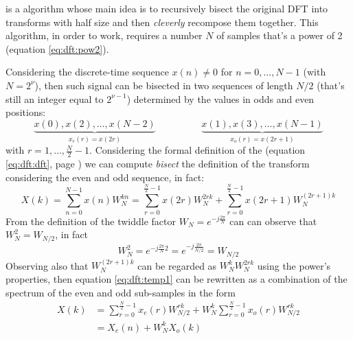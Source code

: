 		 is a \fft algorithm whose main idea is to recursively bisect the original DFT into transforms with half size and then \textit{cleverly} recompose them together. This algorithm, in order to work, requires a number $N$ of samples that's a power of 2 (equation \ref{eq:dft:pow2}).
		
		Considering the discrete-time sequence $x(n) \neq 0$ for $n=0,\dots, N-1$ (with $N=2^\nu$), then such signal can be bisected in two sequences of length $N/2$ (that's still an integer equal to $2^{\nu-1}$) determined by the values in odds and even positions:
		\begin{equation}
			\underbrace{x(0),x(2),\dots, x(N-2)}_{x_e(r) = x(2r)} \hspace{2cm} \underbrace{x(1),x(3),\dots, x(N-1)}_{x_o(r) = x(2r+1)} 
		\end{equation}
		with $r = 1,\dots, \frac N2-1$. Considering the formal definition of the \dft (equation \ref{eq:dft:dft}, page \pageref{eq:dft:dft}) we can compute \textit{bisect} the definition of the transform considering the even and odd sequence, in fact:
		\begin{equation} \label{eq:dft:temp1}
			X(k) = \sum_{n=0}^{N-1} x(n) W_{N}^{kn} = \sum_{r=0}^{\frac N2-1} x(2r) W_N^{2rk} + \sum_{r=0}^{\frac N2-1} x(2r+1) W_N^{(2r + 1)k}
		\end{equation}
		From the definition of the twiddle factor $W_N = e^{-j\frac{2\pi}{N}}$ can can observe that $W_N^2 = W_{N/2}$, in fact
		\begin{equation}
			W_N^2 = e^{-j\frac{2\pi}{N}2} = e^{-j\frac{2\pi}{N/2}} = W_{N/2}
		\end{equation}
		Observing also that $W_N^{(2r+1)k}$ can be regarded as $W_N^k W_N^{2rk}$ using the power's properties, then equation \ref{eq:dft:temp1} can be rewritten as a combination of the spectrum of the even and odd sub-samples in the form
		\begin{equation}
		\begin{aligned}
			X(k) & = \sum_{r=0}^{\frac N2-1} x_e(r) W_{N/2}^{rk} + W_N^k\sum_{r=0}^{\frac N2-1} x_o(r) W_{N/2}^{rk} \\
			& = X_e(n) + W_N^k X_o(k)
		\end{aligned}
		\end{equation}
		

